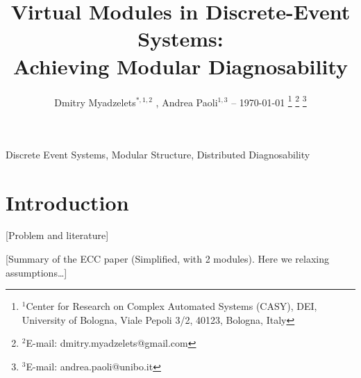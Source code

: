 \documentclass[a4paper, 10pt, conference]{ieeeconf}
\begin{document}
\title{Virtual Modules in Discrete-Event Systems: \\
Achieving Modular Diagnosability} 
\author{
	Dmitry Myadzelets$^{*,1,2}$
	, Andrea Paoli$^{1,3}$
	-- \today
	\thanks{$^{1}$Center for Research on Complex Automated Systems (CASY), DEI,
	University of Bologna, Viale Pepoli 3/2, 40123, Bologna, Italy}
		\thanks{$^{2}$E-mail: {dmitry.myadzelets@gmail.com}}
		\thanks{$^{3}$E-mail: {andrea.paoli@unibo.it}}
}
\maketitle


\begin{abstract}

\end{abstract}

\begin{keywords}
Discrete Event Systems, Modular Structure, Distributed Diagnosability
\end{keywords}

\newtheorem{theorem}{Theorem}
\newtheorem{definition}{Definition}
\newtheorem{lemma}{Lemma}
\newtheorem{assumption}{Assumption}
\newtheorem{corollary}{Corollary}
\newtheorem{example}{Example}
\newtheorem{algorithm}{Algorithm}


\section{Introduction}

[Problem and literature]

[Summary of the ECC paper (Simplified, with 2 modules). Here we relaxing
assumptions\ldots]
\end{document}
